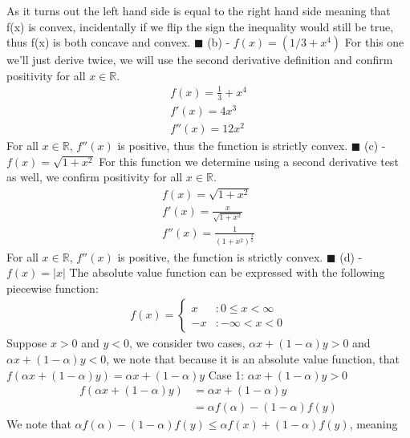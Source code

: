 \documentclass{article}
\begin{document}
As it turns out the left hand side is equal to the right hand side meaning that f(x) is convex, incidentally if we flip the sign the inequality would still be true, thus f(x) is both concave and convex. $\blacksquare$
\newline
\break
(b) - \underline{$f(x) = (1/3+x^4)$} \qquad For this one we'll just derive twice, we will use the second derivative definition and confirm positivity for all $x \in \mathbb{R}$.
\begin{align*}
    f(x) = \frac{1}{3} + x^4 \\
    f'(x) = 4x^3 \\
    f''(x) = 12x^2
\end{align*}
For all $x \in \mathbb{R}$, $f''(x)$ is positive, thus the function is strictly convex. $\blacksquare$
\newline
\break
(c) - \underline{$f(x) = \sqrt{1+x^2}$} \qquad For this function we determine using a second derivative test as well, we confirm positivity for all $x \in \mathbb{R}$.
\begin{align*}
    f(x) = \sqrt{1 + x^2} \\ 
    f'(x) = \frac{x}{\sqrt{1+x^2}} \\
    f''(x) = \frac{1}{(1+x^2)^\frac{3}{2}}
\end{align*}
For all $x \in \mathbb{R}$, $f''(x)$ is positive, the function is strictly convex. $\blacksquare$
\newline
\break
(d) - \underline{$f(x) = |x|$} \qquad The absolute value function can be expressed with the following piecewise function:
\begin{align*}
    f(x) = 
    \begin{cases}
        x & : 0 \leq x < \infty \\
        -x & : - \infty < x < 0 
    \end{cases}
\end{align*}
Suppose $x > 0$ and $y < 0$, we consider two cases, $\alpha x + (1 - \alpha)y > 0$ and $\alpha x + (1 - \alpha)y < 0$, we note that because it is an absolute value function, that $f(\alpha x + (1 - \alpha)y) = \alpha x + (1 - \alpha)y$
\newline Case 1: $\alpha x + (1 - \alpha)y > 0$
\begin{align*}
    f(\alpha x + (1 - \alpha)y) & = \alpha x + (1 - \alpha)y \\
    & = \alpha f(\alpha) - (1 - \alpha)f(y) 
\end{align*}
We note that $ \alpha f(\alpha) - (1 - \alpha)f(y) \leq \alpha f(x) + (1 - \alpha)f(y)$, meaning
\end{document}
